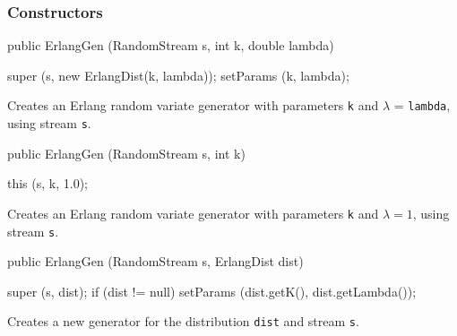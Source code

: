 \subsubsection* {Constructors}
\begin{code}

   public ErlangGen (RandomStream s, int k, double lambda) \begin{hide} {
      super (s, new ErlangDist(k, lambda));
      setParams (k, lambda);
   }\end{hide}
\end{code} 
\begin{tabb} Creates an Erlang random variate generator with parameters
 \texttt{k} and $\lambda $ = \texttt{lambda},
  using stream \texttt{s}. 
\end{tabb}
\begin{code}

   public ErlangGen (RandomStream s, int k) \begin{hide} {
      this (s, k, 1.0);
   }\end{hide}
\end{code} 
\begin{tabb} Creates an Erlang random variate generator with parameters
 \texttt{k} and $\lambda = 1$, using stream \texttt{s}. 
\end{tabb}
\begin{code}
    
   public ErlangGen (RandomStream s, ErlangDist dist) \begin{hide} {
      super (s, dist);
      if (dist != null)
         setParams (dist.getK(), dist.getLambda());
   }\end{hide}
\end{code}
 \begin{tabb}  Creates a new generator for the distribution \texttt{dist}
    and stream \texttt{s}.
 \end{tabb}

